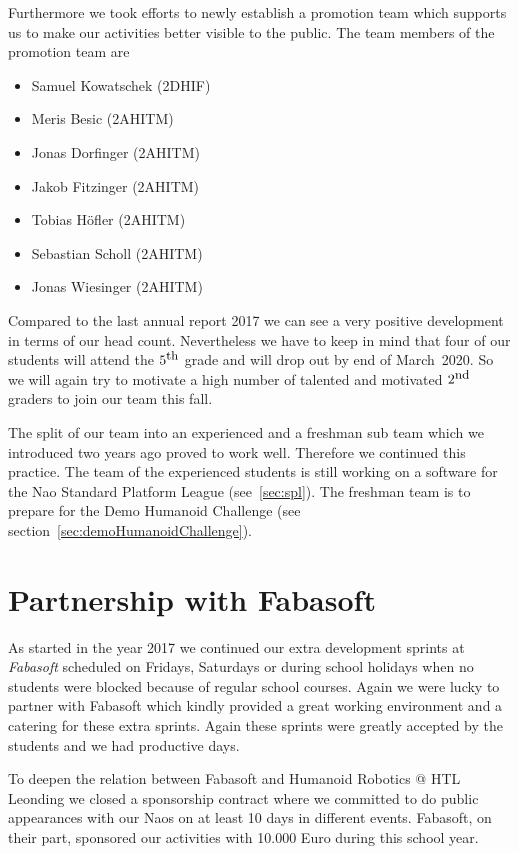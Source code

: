 \documentclass[11pt]{article}
\begin{document}
Furthermore we took efforts to newly establish a promotion team which supports us to make our activities better visible to the public. The team members of the promotion team are

\begin{multicols}{2}
\begin{itemize}
	\item Samuel Kowatschek (2DHIF)
	\item Meris Besic (2AHITM)
	\item Jonas Dorfinger (2AHITM)
	\item Jakob Fitzinger (2AHITM)
	\item Tobias Höfler (2AHITM)
	\item Sebastian Scholl (2AHITM)
	\item Jonas Wiesinger (2AHITM)
\end{itemize}
\end{multicols}

Compared to the last annual report 2017 we can see a very positive development in terms of our head count. Nevertheless we have to keep in mind that four of our students will attend the $5^{\textrm{\small th}}$ grade and will drop out by end of March~2020. So we will again try to motivate a high number of talented and motivated $2^{\textrm{\small nd}}$ graders to join our team this fall.

The split of our team into an experienced and a freshman sub team which we introduced two years ago proved to work well. Therefore we continued this practice. The team of the experienced students is still  working on a software for the Nao Standard Platform League (see~\ref{sec:spl}). The freshman team is to prepare for the Demo Humanoid Challenge (see section~\ref{sec:demoHumanoidChallenge}).

\section{Partnership with Fabasoft}
As started in the year 2017 we continued our extra development sprints at {\em Fabasoft} scheduled on Fridays, Saturdays or during school holidays when no students were blocked because of regular school courses. Again we were lucky to partner with Fabasoft which kindly provided a great working environment and a catering for these extra sprints. Again these sprints were greatly accepted by the students and we had productive days.

To deepen the relation between Fabasoft and Humanoid Robotics @ HTL Leonding we closed a sponsorship contract where we committed to do public appearances with our Naos on at least 10 days in different events. Fabasoft, on their part, sponsored our activities with 10.000 Euro during this school year.
\end{document}
